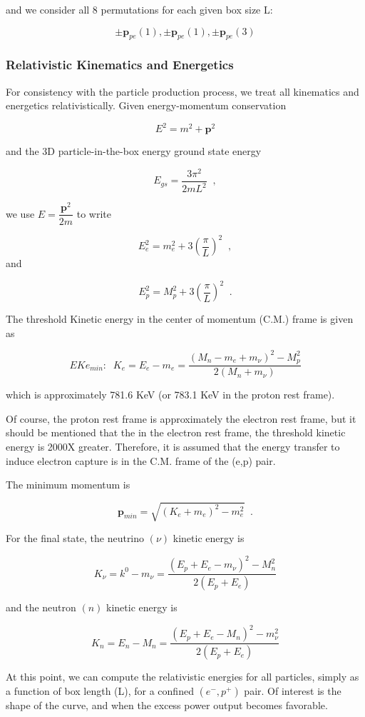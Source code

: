 \documentclass[%
 aip,
 jmp,%
 amsmath,amssymb,
 reprint,%
]{revtex4-1}
\begin{document}
and we consider all 8 permutations for each given box size L:

$$\pm\mathbf{p}_{pe}(1), \pm\mathbf{p}_{pe}(1), \pm\mathbf{p}_{pe}(3)$$

\subsubsection{Relativistic Kinematics and Energetics}
For consistency with the particle production process, we treat all kinematics and energetics relativistically.  Given energy-momentum conservation

$$E^{2}=m^{2}+\mathbf{p}^{2}$$

and the 3D particle-in-the-box energy ground state energy 

$$E_{gs}=\dfrac{3\pi^{2}}{2mL^{2}}\;\;,$$

we use $E=\dfrac{\mathbf{p}^{2}}{2m}$ to write

$$E^{2}_{e}=m^{2}_{e}+3\left(\dfrac{\pi}{L}\right)^{2}\;\;,$$ and

$$E^{2}_{p}=M^{2}_{p}+3\left(\dfrac{\pi}{L}\right)^{2}\;\;.$$

The threshold Kinetic energy in the center of momentum (C.M.) frame is given as

$$EKe_{min}:\;\;K_{e}=E_{e}-m_{e}=\dfrac{(M_{n}-m_{e}+m_{\nu})^{2}-M^{2}_{p}}{2(M_{n}+m_{\nu})}$$

which is approximately 781.6 KeV (or 783.1 KeV in the proton rest frame).

Of course, the proton rest frame is approximately the electron rest frame, but it should be mentioned that the in the electron rest frame, the threshold kinetic energy is 2000X greater.  Therefore, it is assumed that the energy transfer to induce electron capture is in the C.M. frame of the (e,p) pair.

The minimum momentum is 

$$\mathbf{p}_{min}=\sqrt{(K_{e}+m_{e})^{2}-m_{e}^{2}}\;\;.$$

For the final state, the neutrino $(\nu)$ kinetic energy is

$$K_{\nu}=k^{0}-m_{\nu}=\dfrac{(E_{p}+E_{e}-m_{\nu})^{2}-M^{2}_{n}}{2(E_{p}+E_{e})}$$

and the neutron $(n)$ kinetic energy is

$$K_{n}=E_{n}-M_{n}=\dfrac{(E_{p}+E_{e}-M_{n})^{2}-m^{2}_{\nu}}{2(E_{p}+E_{e})}$$

At this point, we can compute the relativistic energies for all particles, simply as a function of box length (L), for a confined $(e^{-},p^{+})$ pair.  Of interest is the shape of the curve, and when the excess power output becomes favorable.  
\end{document}
